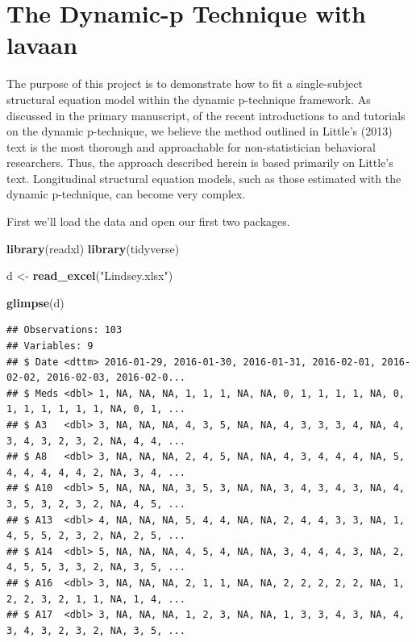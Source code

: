 \documentclass[]{article}
\title{}
\author{}
\date{}
\newenvironment{Shaded}{\begin{snugshade}}{\end{snugshade}}
\newcommand{\KeywordTok}[1]{\textcolor[rgb]{0.13,0.29,0.53}{\textbf{#1}}}
\newcommand{\StringTok}[1]{\textcolor[rgb]{0.31,0.60,0.02}{#1}}
\newcommand{\NormalTok}[1]{#1}
\begin{document}
\section{The Dynamic-p Technique with
lavaan}\label{the-dynamic-p-technique-with-lavaan}

The purpose of this project is to demonstrate how to fit a
single-subject structural equation model within the dynamic p-technique
framework. As discussed in the primary manuscript, of the recent
introductions to and tutorials on the dynamic p-technique, we believe
the method outlined in Little's (2013) text is the most thorough and
approachable for non-statistician behavioral researchers. Thus, the
approach described herein is based primarily on Little's text.
Longitudinal structural equation models, such as those estimated with
the dynamic p-technique, can become very complex.

First we'll load the data and open our first two packages.

\begin{Shaded}
\begin{Highlighting}[]
\KeywordTok{library}\NormalTok{(readxl)}
\KeywordTok{library}\NormalTok{(tidyverse)}

\NormalTok{d <-}\StringTok{ }\KeywordTok{read_excel}\NormalTok{(}\StringTok{"Lindsey.xlsx"}\NormalTok{)}

\KeywordTok{glimpse}\NormalTok{(d)}
\end{Highlighting}
\end{Shaded}

\begin{verbatim}
## Observations: 103
## Variables: 9
## $ Date <dttm> 2016-01-29, 2016-01-30, 2016-01-31, 2016-02-01, 2016-02-02, 2016-02-03, 2016-02-0...
## $ Meds <dbl> 1, NA, NA, NA, 1, 1, 1, NA, NA, 0, 1, 1, 1, 1, NA, 0, 1, 1, 1, 1, 1, 1, NA, 0, 1, ...
## $ A3   <dbl> 3, NA, NA, NA, 4, 3, 5, NA, NA, 4, 3, 3, 3, 4, NA, 4, 3, 4, 3, 2, 3, 2, NA, 4, 4, ...
## $ A8   <dbl> 3, NA, NA, NA, 2, 4, 5, NA, NA, 4, 3, 4, 4, 4, NA, 5, 4, 4, 4, 4, 4, 2, NA, 3, 4, ...
## $ A10  <dbl> 5, NA, NA, NA, 3, 5, 3, NA, NA, 3, 4, 3, 4, 3, NA, 4, 3, 5, 3, 2, 3, 2, NA, 4, 5, ...
## $ A13  <dbl> 4, NA, NA, NA, 5, 4, 4, NA, NA, 2, 4, 4, 3, 3, NA, 1, 4, 5, 5, 2, 3, 2, NA, 2, 5, ...
## $ A14  <dbl> 5, NA, NA, NA, 4, 5, 4, NA, NA, 3, 4, 4, 4, 3, NA, 2, 4, 5, 5, 3, 3, 2, NA, 3, 5, ...
## $ A16  <dbl> 3, NA, NA, NA, 2, 1, 1, NA, NA, 2, 2, 2, 2, 2, NA, 1, 2, 2, 3, 2, 1, 1, NA, 1, 4, ...
## $ A17  <dbl> 3, NA, NA, NA, 1, 2, 3, NA, NA, 1, 3, 3, 4, 3, NA, 4, 3, 4, 3, 2, 3, 2, NA, 3, 5, ...
\end{verbatim}
\end{document}
